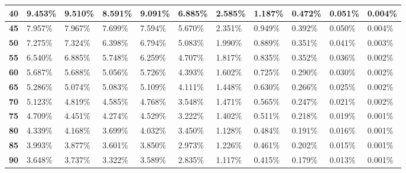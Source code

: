 \begin{table}[ht]
\begin{tabular}{|l|l|l|l|l|l|l|l|l|l|l|}
\textbf{40}      & 9.453\%           & 9.510\%           & 8.591\%           & 9.091\%           & 6.885\%          & 2.585\%          & 1.187\%         & 0.472\%         & 0.051\%         & 0.004\%        \\ \hline
\textbf{45}      & 7.957\%           & 7.967\%           & 7.699\%           & 7.594\%           & 5.670\%          & 2.351\%          & 0.949\%         & 0.392\%         & 0.050\%         & 0.004\%        \\ \hline
\textbf{50}      & 7.275\%           & 7.324\%           & 6.398\%           & 6.794\%           & 5.083\%          & 1.990\%          & 0.889\%         & 0.351\%         & 0.041\%         & 0.003\%        \\ \hline
\textbf{55}      & 6.540\%           & 6.885\%           & 5.748\%           & 6.259\%           & 4.707\%          & 1.817\%          & 0.835\%         & 0.352\%         & 0.036\%         & 0.002\%        \\ \hline
\textbf{60}      & 5.687\%           & 5.688\%           & 5.056\%           & 5.726\%           & 4.393\%          & 1.602\%          & 0.725\%         & 0.290\%         & 0.030\%         & 0.002\%        \\ \hline
\textbf{65}      & 5.286\%           & 5.074\%           & 5.083\%           & 5.109\%           & 4.111\%          & 1.448\%          & 0.630\%         & 0.266\%         & 0.025\%         & 0.002\%        \\ \hline
\textbf{70}      & 5.123\%           & 4.819\%           & 4.585\%           & 4.768\%           & 3.548\%          & 1.471\%          & 0.565\%         & 0.247\%         & 0.021\%         & 0.002\%        \\ \hline
\textbf{75}      & 4.709\%           & 4.451\%           & 4.274\%           & 4.529\%           & 3.222\%          & 1.402\%          & 0.511\%         & 0.218\%         & 0.019\%         & 0.001\%        \\ \hline
\textbf{80}      & 4.339\%           & 4.168\%           & 3.699\%           & 4.032\%           & 3.450\%          & 1.128\%          & 0.484\%         & 0.191\%         & 0.016\%         & 0.001\%        \\ \hline
\textbf{85}      & 3.993\%           & 3.877\%           & 3.601\%           & 3.850\%           & 2.973\%          & 1.226\%          & 0.461\%         & 0.202\%         & 0.015\%         & 0.001\%        \\ \hline
\textbf{90}      & 3.648\%           & 3.737\%           & 3.322\%           & 3.589\%           & 2.835\%          & 1.117\%          & 0.415\%         & 0.179\%         & 0.013\%         & 0.001\%        \\ \hline

\end{tabular}
\end{table}

